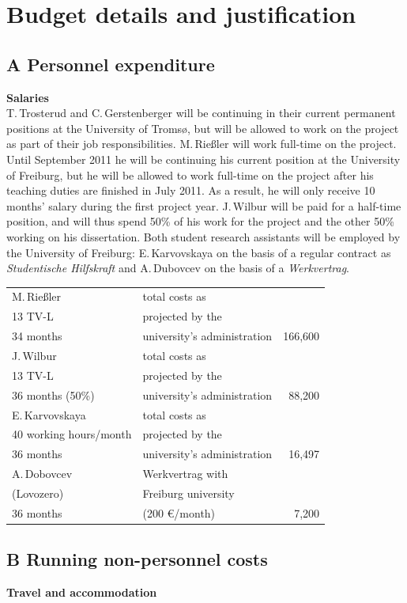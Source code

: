 \documentclass[a4paper,12pt]{article}
\begin{document}
{{\newpage
\section{Budget details and justification}
\subsection*{A Personnel expenditure}
\noindent \textbf{Salaries}\\
T.\,Trosterud and C.\,Gersten\-berger will be continuing in their current permanent positions at the University of Tromsø, but will be allowed to work on the project as part of their job responsibilities. M.\,Rießler will work full-time on the project. Until September 2011 he will be continuing his current position at the University of Freiburg, but he will be allowed to work full-time on the project after his teaching duties are finished in July 2011. As a result, he will only receive 10 months' salary during the first project year. J.\,Wilbur will be paid for a half-time position, and will thus spend 50\% of his work for the project and the other 50\% working on his dissertation. Both student research assistants will be employed by the University of Freiburg: E.\,Karvovskaya on the basis of a regular contract as {\it Studentische Hilfskraft} and A.\,Dubovcev on the basis of a {\it Werkvertrag}.
\begin{longtable}{| l | l | r |}
\hline
M.\,Rießler&total costs as&\\
13 TV-L&projected by the&\\
34 months&university's administration&166,600\\
\hline
J.\,Wilbur&total costs as&\\
13 TV-L&projected by the&\\
36 months (50\%)&university's administration&88,200\\
\hline
E.\,Karvovskaya&total costs as&\\
40 working hours/month& projected by the&\\
36 months&university's administration&16,497\\
\hline
A.\,Dobovcev	&Werkvertrag with	&\\
(Lovozero)	&Freiburg university	&\\
36 months		&(200 €/month)		&7,200\\
\hline
\end{longtable}

\subsection*{B Running non-personnel costs}
\noindent \textbf{Travel and accommodation}

}}
\end{document}
